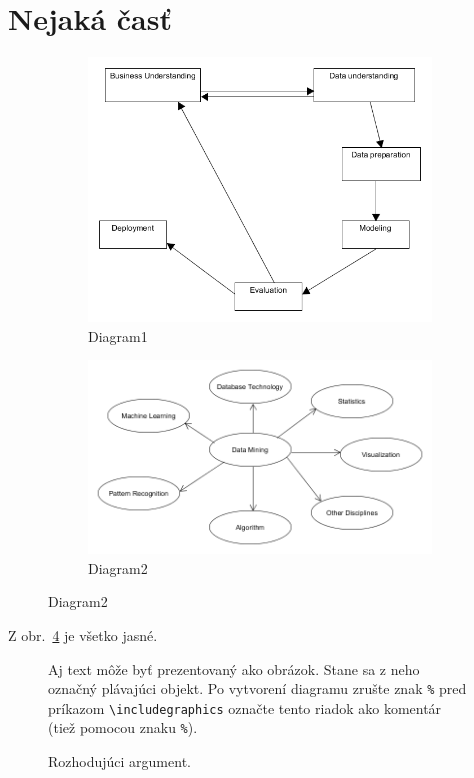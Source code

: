 \documentclass[10pt,twocolumn,twoside,slovak,a4paper]{article}
\begin{document}
\section{Nejaká časť} \label{nejaka}
\begin{figure}[h!]
\centering
\begin{subfigure}[b]{0.4\linewidth}
  \includegraphics[width=\linewidth]{diagram1.png}
  \caption{ Diagram1}
  \label{fig:Diagram1}
\end{subfigure}
\begin{subfigure}[b]{0.4\linewidth}
  \includegraphics[width=\linewidth]{diagram2.png}
  \caption{ Diagram2}
  \label{fig:Diagram2}
\end{subfigure}
\end{figure}

Z obr.~\ref{f:rozhod} je všetko jasné. 

\begin{figure}[tbh]
\centering
Aj text môže byť prezentovaný ako obrázok. Stane sa z neho označný plávajúci objekt. Po vytvorení diagramu zrušte znak \texttt{\%} pred príkazom \verb|\includegraphics| označte tento riadok ako komentár (tiež pomocou znaku \texttt{\%}).
\caption{Rozhodujúci argument.}
\label{f:rozhod}
\end{figure}
\end{document}
